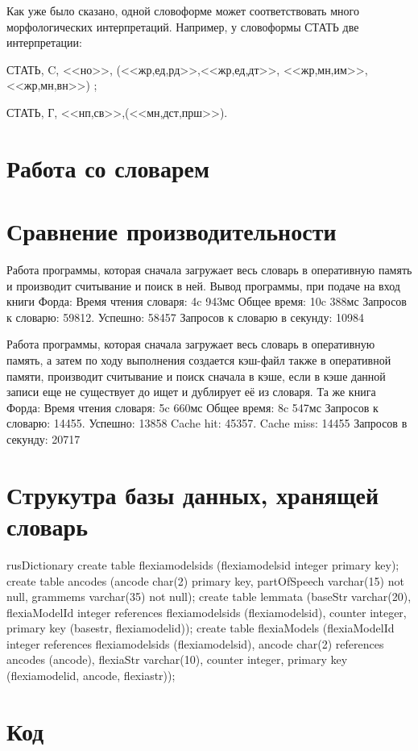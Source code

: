 \documentclass[12pt,a4paper,onecolumn]{report}
\begin{document}
Как уже было сказано, одной словоформе может соответствовать много морфологических интерпретаций. Например, у словоформы СТАТЬ две интерпретации:

{СТАТЬ, C, <<но>>, (<<жр,ед,рд>>,<<жр,ед,дт>>, <<жр,мн,им>>, <<жр,мн,вн>>) };

{СТАТЬ, Г, <<нп,св>>,(<<мн,дст,прш>>)}.
\chapter{Работа со словарем}

\chapter{Сравнение производительности}
Работа программы, которая сначала загружает весь словарь в оперативную память и производит считывание и поиск в ней.
Вывод программы, при подаче на вход книги Форда:
Время чтения словаря: 4c 943мс
Общее время: 10c 388мс
Запросов к словарю: 59812. Успешно: 58457
Запросов к словарю в секунду: 10984

Работа программы, которая сначала загружает весь словарь в оперативную память, а затем по ходу выполнения создается кэш-файл также в оперативной памяти, производит считывание и поиск сначала в кэше, если в кэше данной записи еще не существует до ищет и дублирует её из словаря.
Та же книга Форда:
Время чтения словаря: 5c 660мс
Общее время: 8c 547мс
Запросов к словарю: 14455. Успешно: 13858
Cache hit: 45357. Cache miss: 14455
Запросов в секунду: 20717

\chapter{Струкутра базы данных, хранящей словарь}
rusDictionary
create table flexiamodelsids (flexiamodelsid integer primary key);
create table ancodes (ancode char(2) primary key, partOfSpeech varchar(15) not null, grammems varchar(35) not null);
create table lemmata (baseStr varchar(20), flexiaModelId integer references flexiamodelsids (flexiamodelsid), counter integer, primary key (basestr, flexiamodelid));
create table flexiaModels (flexiaModelId integer references flexiamodelsids (flexiamodelsid), ancode char(2) references ancodes (ancode), flexiaStr varchar(10), counter integer, primary key (flexiamodelid, ancode, flexiastr));




\chapter{Код}

\end{document}
